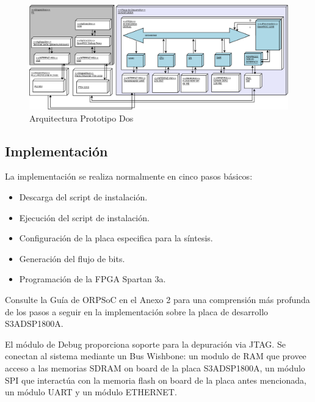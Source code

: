 		\begin{figure}[!h]
 		\begin{center}
  		\includegraphics[width=1\textwidth,keepaspectratio=true]{./images/orpsoc}
  		\caption{Arquitectura Prototipo Dos}
  		\label{fig:orpsoc} 
 		\end{center}
		\end{figure}
	
		\subsection{Implementación}

		La implementación se realiza normalmente en cinco pasos básicos: 
		\begin {itemize}
		\item Descarga del script de instalación.
		\item Ejecución del script de instalación.
		\item Configuración de la placa especifica para la síntesis.
		\item Generación del flujo de bits.
		\item Programación de la FPGA Spartan 3a.
 		\end {itemize}
 
 Consulte la Guía de ORPSoC en el Anexo 2 para una comprensión más profunda de los pasos a seguir en la implementación sobre la placa de desarrollo S3ADSP1800A.

El módulo de Debug proporciona soporte para la depuración via JTAG. Se conectan al sistema mediante un Bus Wishbone: un modulo de RAM que provee acceso a las memorias SDRAM on board de la placa S3ADSP1800A, un módulo SPI que interactúa con la memoria flash on board de la placa antes mencionada, un módulo UART y un módulo ETHERNET. 
		

